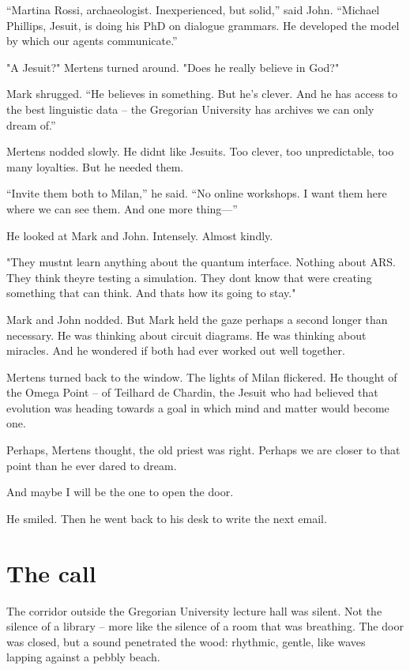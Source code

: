 \documentclass[
]{article}
\begin{document}
``Martina Rossi, archaeologist. Inexperienced, but solid,'' said John. ``Michael Phillips, Jesuit, is doing his PhD on dialogue grammars. He developed the model by which our agents communicate.''

"A Jesuit?" Mertens turned around. "Does he really believe in God?"

Mark shrugged. ``He believes in something. But he's clever. And he has access to the best linguistic data -- the Gregorian University has archives we can only dream of.''

Mertens nodded slowly. He didn\textquotesingle t like Jesuits. Too clever, too unpredictable, too many loyalties. But he needed them.

``Invite them both to Milan,'' he said. ``No online workshops. I want them here where we can see them. And one more thing---''

He looked at Mark and John. Intensely. Almost kindly.

"They mustn\textquotesingle t learn anything about the quantum interface. Nothing about ARS. They think they\textquotesingle re testing a simulation. They don\textquotesingle t know that we\textquotesingle re creating something that can think. And that\textquotesingle s how it\textquotesingle s going to stay."

Mark and John nodded. But Mark held the gaze perhaps a second longer than necessary. He was thinking about circuit diagrams. He was thinking about miracles. And he wondered if both had ever worked out well together.

Mertens turned back to the window. The lights of Milan flickered. He thought of the Omega Point -- of Teilhard de Chardin, the Jesuit who had believed that evolution was heading towards a goal in which mind and matter would become one.

Perhaps, Mertens thought, the old priest was right. Perhaps we are closer to that point than he ever dared to dream.

And maybe I will be the one to open the door.

He smiled. Then he went back to his desk to write the next email.

\section{The call}\label{the-call}

The corridor outside the Gregorian University lecture hall was silent. Not the silence of a library -- more like the silence of a room that was breathing. The door was closed, but a sound penetrated the wood: rhythmic, gentle, like waves lapping against a pebbly beach.
\end{document}
